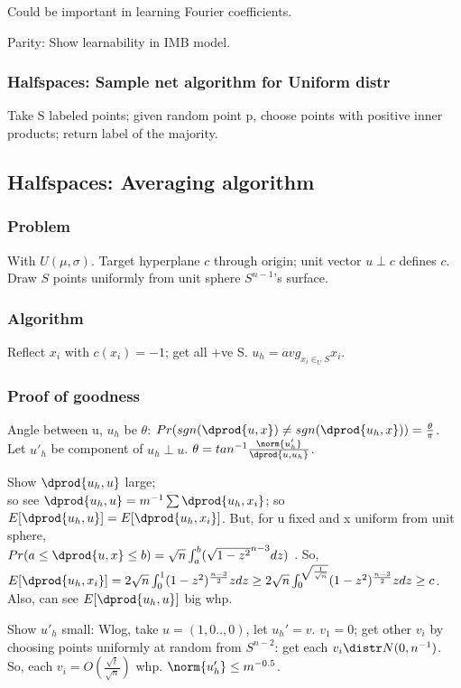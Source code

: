 \documentclass[oneside, article]{memoir}
\begin{document}
Could be important in learning Fourier coefficients.

\oprob Parity: Show learnability in IMB model.

\subsubsection{Halfspaces: Sample net algorithm for Uniform distr}
Take S labeled points; given random point p, choose points with positive inner products; return label of the majority.

\subsection{Halfspaces: Averaging algorithm}
\subsubsection{Problem}
With $U(\mu, \sigma)$. Target hyperplane $c$ through origin; unit vector $u \perp c$ defines $c$. Draw $S$ points uniformly from unit sphere $S^{n-1}$'s surface.

\subsubsection{Algorithm}
Reflect $x_i$ with $c(x_i)=-1$; get all +ve S. $u_{h} = avg_{x_i \in_{U} S} x_i$.

\subsubsection{Proof of goodness}
Angle between u, $u_{h}$ be $\theta$: $Pr(sgn(\dprod{u,x}) \neq sgn(\dprod{u_{h},x})) = \frac{\theta}{\pi}$. Let $u'_{h}$ be component of $u_{h} \perp u$. $\theta = tan^{-1}\frac{\norm{u_{h}'}}{\dprod{u, u_{h}}}$.

Show $\dprod{u_{h},u}$ large; \\
so see $\dprod{u_{h},u} = m^{-1}\sum\dprod{u_{h},x_i}$; so $E[\dprod{u_{h},u}] = E[\dprod{u_{h},x_i}]$. But, for u fixed and x uniform from unit sphere, \\
$Pr(a \leq \dprod{u,x} \leq b) = \sqrt{n}\int_{a}^{b}(\sqrt{1-z^{2}}^{n-3}dz)$ \why. So, $E[\dprod{u_{h},x_i}] = 2\sqrt{n}\int_{0}^{1}(1-z^{2})^{\frac{n-3}{2}}z dz \geq 2\sqrt{n}\int_{0}^{\sqrt{\frac{1}{\sqrt{n}}}}(1-z^{2})^{\frac{n-3}{2}}z dz \geq c$. Also, can see $E[\dprod{u_{h},u}]$ big whp. \why

Show $u'_{h}$ small: Wlog, take $u = (1,0 .., 0)$, let $u_{h}' = v$. $v_{1} = 0$; get other $v_{i}$ by choosing points uniformly at random from $S^{n-2}$: get each $v_{i} \distr N(0, n^{-1})$. So, each $v_{i} = O(\frac{\sqrt{t}}{\sqrt{n}})$ whp. $\norm{u_{h}'} \leq m^{-0.5}$. \why
\end{document}
